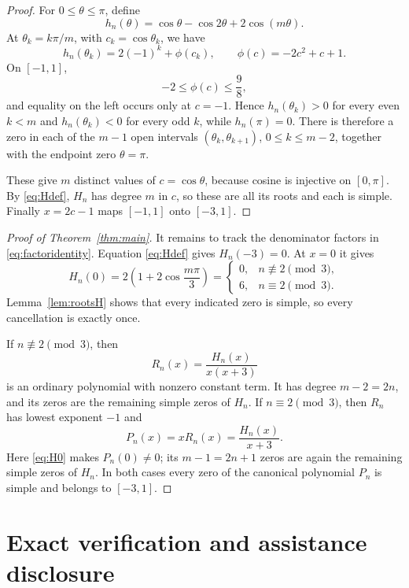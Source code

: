 \documentclass[11pt]{article}
\begin{document}
\begin{proof}
For $0\leq\theta\leq\pi$, define
\[
 h_n(\theta)=\cos\theta-\cos2\theta+2\cos(m\theta).
\]
At $\theta_k=k\pi/m$, with $c_k=\cos\theta_k$, we have
\begin{equation}\label{eq:grid}
 h_n(\theta_k)=2(-1)^k+\phi(c_k),
 \qquad \phi(c)=-2c^2+c+1.
\end{equation}
On $[-1,1]$,
\begin{equation}\label{eq:phi}
 -2\leq\phi(c)\leq\frac98,
\end{equation}
and equality on the left occurs only at $c=-1$.  Hence
$h_n(\theta_k)>0$ for every even $k<m$ and
$h_n(\theta_k)<0$ for every odd $k$, while $h_n(\pi)=0$.
There is therefore a zero in each of the $m-1$ open intervals
$(\theta_k,\theta_{k+1})$, $0\leq k\leq m-2$, together with the endpoint
zero $\theta=\pi$.

These give $m$ distinct values of $c=\cos\theta$, because cosine is
injective on $[0,\pi]$.  By \eqref{eq:Hdef}, $H_n$ has degree $m$ in $c$,
so these are all its roots and each is simple.  Finally $x=2c-1$ maps
$[-1,1]$ onto $[-3,1]$.
\end{proof}

\begin{proof}[Proof of Theorem~\ref{thm:main}]
It remains to track the denominator factors in
\eqref{eq:factoridentity}.  Equation \eqref{eq:Hdef} gives $H_n(-3)=0$.
At $x=0$ it gives
\begin{equation}\label{eq:H0}
 H_n(0)=2\left(1+2\cos\frac{m\pi}{3}\right)
 =\begin{cases}
    0,&n\not\equiv2\pmod3,\\
    6,&n\equiv2\pmod3.
  \end{cases}
\end{equation}
Lemma~\ref{lem:rootsH} shows that every indicated zero is simple, so every
cancellation is exactly once.

If $n\not\equiv2\pmod3$, then
\[
 R_n(x)=\frac{H_n(x)}{x(x+3)}
\]
is an ordinary polynomial with nonzero constant term.  It has degree
$m-2=2n$, and its zeros are the remaining simple zeros of $H_n$.  If
$n\equiv2\pmod3$, then $R_n$ has lowest exponent $-1$ and
\[
 P_n(x)=xR_n(x)=\frac{H_n(x)}{x+3}.
\]
Here \eqref{eq:H0} makes $P_n(0)\ne0$; its $m-1=2n+1$ zeros are again the
remaining simple zeros of $H_n$.  In both cases every zero of the canonical
polynomial $P_n$ is simple and belongs to $[-3,1]$.
\end{proof}

\section{Exact verification and assistance disclosure}
\end{document}
